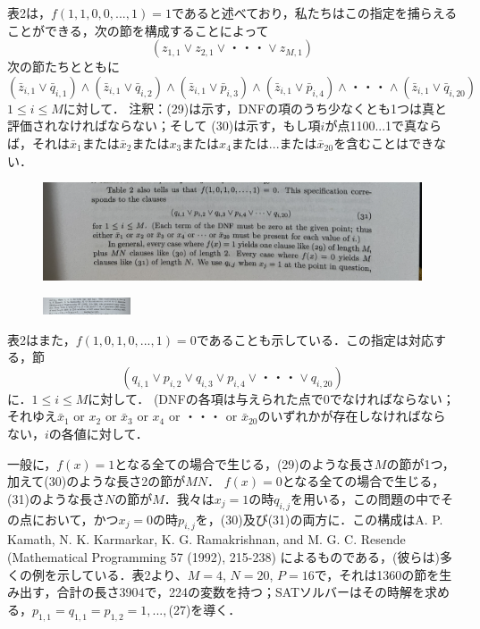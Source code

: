\documentclass[dvipdfmx,a4paper,12pt]{jsarticle}
\begin{document}
 表2は，$f(1,1,0,0,...,1)=1$であると述べており，私たちはこの指定を捕らえることができる，次の節を構成することによって
 \begin{equation}
(z_{1,1} \lor z_{2,1} \lor ・・・ \lor z_{M,1})
\end{equation}  
次の節たちとともに
  \begin{equation}
(\bar{z}_{i,1} \lor \bar{q}_{i,1}) \land (\bar{z}_{i,1} \lor \bar{q}_{i,2}) \land (\bar{z}_{i,1} \lor \bar{p}_{i,3}) \land (\bar{z}_{i,1} \lor \bar{p}_{i,4}) \land ・・・ \land (\bar{z}_{i,1} \lor \bar{q}_{i,20})
\end{equation}  
$1 \le i \le M$に対して．
注釈：(29)は示す，DNFの項のうち少なくとも1つは真と評価されなければならない；そして
(30)は示す，もし項$i$が点1100...1で真ならば，それは$\bar{x}_{1}$または$\bar{x}_{2}$または$x_{3}$または$x_{4}または...$または$\bar{x}_{20}$を含むことはできない．

\clearpage
\begin{figure}[htbp]
  \centering
  \includegraphics[width=130mm]{images/2-4.png}
\end{figure}
\begin{figure}[htbp]
  \centering
  \includegraphics[width=26mm,angle=270]{images/3-1.jpg}
\end{figure}

表2はまた，$f(1,0,1,0,...,1)=0$であることも示している．この指定は対応する，節
  \begin{equation}
(q_{i,1} \lor p_{i,2} \lor q_{i,3} \lor p_{i,4} \lor ・・・ \lor q_{i,20})
\end{equation}  
に．$1 \le i \le M$に対して．
(DNFの各項は与えられた点で0でなければならない；それゆえ$\bar{x}_{1}$ or $x_{2}$ or $\bar{x}_{3}$ or $x_{4}$ or ・・・ or $\bar{x}_{20}$のいずれかが存在しなければならない，$i$の各値に対して．

一般に，$f(x) = 1$となる全ての場合で生じる，(29)のような長さ$M$の節が1つ，加えて(30)のような長さ2の節が$MN$．
$f(x) = 0$となる全ての場合で生じる，(31)のような長さ$N$の節が$M$．我々は$x_{j}=1$の時$q_{i,j}$を用いる，この問題の中でその点において，かつ$x_{j}=0$の時$p_{i,j}$を，(30)及び(31)の両方に．この構成はA. P. Kamath, N. K. Karmarkar, K. G. Ramakrishnan, and M. G. C. Resende (Mathematical Programming 57 (1992), 215-238) によるものである，(彼らは)多くの例を示している．表2より、$M = 4$, $N = 20$, $P = 16$で，それは1360の節を生み出す，合計の長さ3904で，224の変数を持つ；SATソルバーはその時解を求める，$p_{1,1}=q_{1,1}=p_{1,2}=1,...,$(27)を導く．
\end{document}
